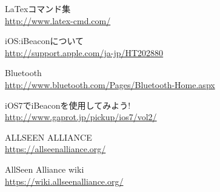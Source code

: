 \def\line{−\hspace*{-.7zw}−}

\begin{thebibliography}{99}

 LaTexコマンド集 \\ 
\url{http://www.latex-cmd.com/}

 iOS:iBeaconについて \\ 
\url{http://support.apple.com/ja-jp/HT202880}

 Bluetooth \\ 
\url{http://www.bluetooth.com/Pages/Bluetooth-Home.aspx}

 iOS7でiBeaconを使用してみよう! \\ 
\url{http://www.gaprot.jp/pickup/ios7/vol2/}

 ALLSEEN ALLIANCE \\
\url{https://allseenalliance.org/}

AllSeen Alliance wiki \\
\url{https://wiki.allseenalliance.org/}

\end{thebibliography}
